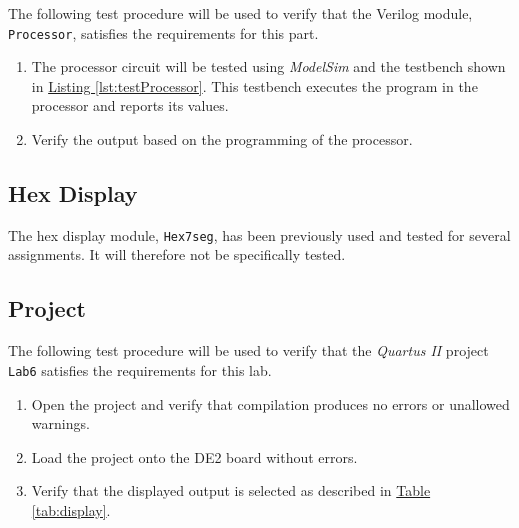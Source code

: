 The following test procedure will be used to verify that the Verilog module, \verb|Processor|, satisfies the requirements for this part.

\begin{enumerate}
    \item The processor circuit will be tested using \emph{ModelSim} and the testbench shown in \hyperref[lst:testProcessor]{Listing \ref*{lst:testProcessor}}.
    This testbench executes the program in the processor and reports its values.
    \item Verify the output based on the programming of the processor.
\end{enumerate}


\subsection{Hex Display} %
\label{sub:hex_display}

The hex display module, \verb|Hex7seg|, has been previously used and tested for several assignments.
It will therefore not be specifically tested.

\subsection{Project} %
\label{sub:project_pro}

The following test procedure will be used to verify that the \emph{Quartus II} project \verb|Lab6| satisfies the requirements for this lab.

\begin{enumerate}
    \item Open the project and verify that compilation produces no errors or unallowed warnings.
    \item Load the project onto the DE2 board without errors.
    \item Verify that the displayed output is selected as described in \hyperref[tab:display]{Table \ref*{tab:display}}.
\end{enumerate}


